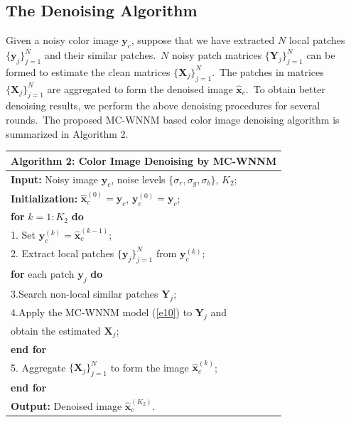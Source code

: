 \documentclass[10pt,twocolumn,letterpaper]{article}
\begin{document}
\vspace{-2mm}
\subsection{The Denoising Algorithm}
\vspace{-2mm}

Given a noisy color image $\mathbf{y}_{c}$, suppose that we have extracted $N$ local patches $\{\mathbf{y}_{j}\}_{j=1}^{N}$ and their similar patches.\ $N$ noisy patch matrices $\{\mathbf{Y}_{j}\}_{j=1}^{N}$ can be formed to estimate the clean matrices $\{\mathbf{X}_{j}\}_{j=1}^{N}$.\ The patches in matrices $\{\mathbf{X}_{j}\}_{j=1}^{N}$ are aggregated to form the denoised  image $\hat{\mathbf{x}}_{c}$.\ To obtain better denoising results, we perform the above denoising procedures for several rounds.\ The proposed MC-WNNM based color image denoising algorithm is summarized in Algorithm 2.
\begin{table}
\vspace{1mm}
\begin{tabular}{l}
\hline
\textbf{Algorithm 2}: Color Image Denoising by MC-WNNM
\\
\hline
\textbf{Input:} Noisy image $\mathbf{y}_{c}$, noise levels $\{\sigma_{r}, \sigma_{g}, \sigma_{b}\}$, $K_{2}$;
\\
\textbf{Initialization:} $\hat{\mathbf{x}}_{c}^{(0)}=\mathbf{y}_{c}$, $\mathbf{y}_{c}^{(0)}=\mathbf{y}_{c}$;
\\
\textbf{for} $k = 1:K_{2}$ \textbf{do}
\\
1. Set $\mathbf{y}_{c}^{(k)}=\hat{\mathbf{x}}_{c}^{(k-1)}$;
\\
2. Extract local patches $\{\mathbf{y}_{j}\}_{j=1}^{N}$ from $\mathbf{y}_{c}^{(k)}$;
\\
\quad\textbf{for} each patch $\mathbf{y}_{j}$ \textbf{do}
\\
3.\quad Search non-local similar patches $\mathbf{Y}_{j}$;
\\
4.\quad Apply the MC-WNNM model (\ref{e10}) to $\mathbf{Y}_{j}$ and
\\
\quad \quad 
obtain the estimated $\mathbf{X}_{j}$;
\\
\quad\textbf{end for}
\\
5. Aggregate $\{\mathbf{X}_{j}\}_{j=1}^{N}$ to form the image $\hat{\mathbf{x}}_{c}^{(k)}$;
\\
\textbf{end for}
\\
\textbf{Output:} Denoised image $\hat{\mathbf{x}}_{c}^{(K_{2})}$.
\\
\hline
\end{tabular}
\vspace{-2mm}
\label{a2}
\end{table}
\end{document}
